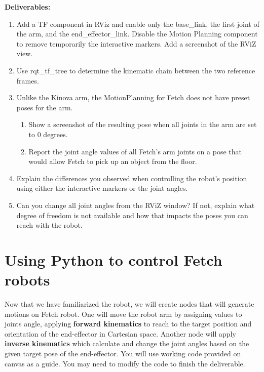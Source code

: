 \documentclass[12pt]{article}
\begin{document}
\textbf{Deliverables:}
\begin{enumerate}
    \item Add a TF component in RViz and enable only the base\_link, the first joint of the arm, and the end\_effector\_link. Disable the Motion Planning component to remove temporarily the interactive markers. Add a screenshot of the RViZ view.

    
    \item Use rqt\_tf\_tree to determine the kinematic chain between the two reference frames.
    
    \item Unlike the Kinova arm, the MotionPlanning for Fetch does not have preset poses for the arm.
    \begin{enumerate}
        \item Show a screenshot of the resulting pose when all joints in the arm are set to 0 degrees.
        \item Report the joint angle values of all Fetch’s arm joints on a pose that would allow Fetch to pick up an object from the floor.
    \end{enumerate}
    
    \item Explain the differences you observed when controlling the robot’s position using either the interactive markers or the joint angles.
    \item Can you change all joint angles from the RViZ window? If not, explain what degree of freedom is not available and how that impacts the poses you can reach with the robot.
\end{enumerate}

\section{Using Python to control Fetch robots}

Now that we have familiarized the robot, we will create nodes that will generate motions on Fetch robot. One will move the robot arm by assigning values to joints angle, applying \textbf{forward kinematics} to reach to the target position and orientation of the end-effector in Cartesian space. Another node will apply 
\textbf{inverse kinematics} which calculate and change the joint angles based on the given target pose of the end-effector. You will use working code provided on canvas as a guide. You may need to modify the code to finish the deliverable.
\end{document}
